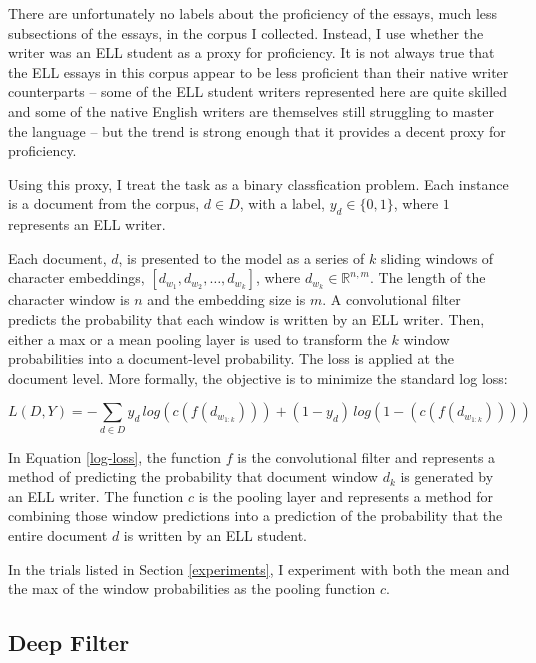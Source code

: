 \documentclass{article} %
\begin{document}
There are unfortunately no labels about the proficiency of the essays, much less
subsections of the essays, in the corpus I collected. Instead, I use whether the
writer was an ELL student as a proxy for proficiency. It is not always true that
the ELL essays in this corpus appear to be less proficient than their native
writer counterparts -- some of the ELL student writers represented here are
quite skilled and some of the native English writers are themselves still
struggling to master the language --
but the trend is strong enough that it provides a decent proxy for proficiency.

Using this proxy, I treat the task as a binary classfication problem. Each
instance is a document from the corpus, $d \in D$, with a label,
$y_d \in \{0, 1\}$, where $1$ represents an ELL writer.

Each document, $d$, is presented to the model as a series of $k$ sliding
windows of character embeddings, $[d_{w_1}, d_{w_2}, \dots, d_{w_k}]$, where
$d_{w_k} \in \mathbb{R}^{n,m}$. The length of the character window is $n$ and
the embedding size is $m$. A convolutional filter
predicts the probability that each window is written by an ELL writer. Then,
either a max or a mean pooling layer is used to transform the $k$ window
probabilities into a document-level probability. The loss is applied at the
document level. More formally, the objective is to minimize the standard log loss:

\begin{equation} \label{log-loss}
L(D, Y) = -\sum_{d \in D} y_d\, log(c(f(d_{w_{1:k}}))) + (1 - y_d)\, log(1 - (c(f(d_{w_{1:k}}))))
\end{equation}

In Equation \ref{log-loss}, the function $f$ is the convolutional filter and
represents a method of predicting the probability that document window $d_k$
is generated by an ELL writer. The function $c$ is the pooling layer and
represents a method for combining those window predictions into a
prediction of the probability that the entire document $d$ is written by an ELL
student.

In the trials listed in Section \ref{experiments}, I experiment with both
the mean and the max of the window probabilities as the pooling function $c$.

\subsection{Deep Filter}
\end{document}
